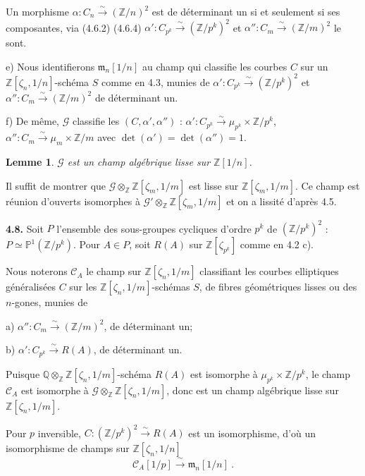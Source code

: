 \documentclass[10pt,a4paper]{amsart}
\theoremstyle{plain}
\newtheorem{lemma}[theorem]{Lemme}
\theoremstyle{definition}
\newcommand{\m}{\mathfrak{m}}
\newcommand{\cC}{\mathcal{C}}
\newcommand{\cG}{\mathcal{G}}
\newcommand{\ZZ}{\mathbb{Z}}
\newcommand{\QQ}{\mathbb{Q}}
\begin{document}
Un morphisme $\alpha : C_n \xrightarrow{\sim} (\ZZ/n)^2$ est de d\'eterminant un si et seulement si ses composantes, via (4.6.2) (4.6.4) $\alpha' : C_{p^k} \xrightarrow{\sim} (\ZZ/p^k)^2$ et $\alpha'' : C_m \xrightarrow{\sim} (\ZZ/m)^2$ le sont.

e) Nous identifierons $\m_n[1/n]$ au champ qui classifie les courbes $C$ sur un $\ZZ[\zeta_n, 1/n]$-sch\'ema $S$ comme en 4.3, munies de $\alpha' : C_{p^k} \xrightarrow{\sim} (\ZZ/p^k)^2$ et $\alpha'' : C_m \xrightarrow{\sim} (\ZZ/m)^2$ de d\'eterminant un.

f) De m\^eme, $\cG$ classifie les $(C, \alpha', \alpha'')$ : $\alpha' : C_{p^k} \xrightarrow{\sim} \mu_{p^k} \times \ZZ/p^k$, $\alpha'' : C_m \xrightarrow{\sim} \mu_m \times \ZZ/m$ avec $\det(\alpha') = \det(\alpha'') = 1$.

\setcounter{theorem}{6}
\begin{lemma}
$\cG$ est un champ alg\'ebrique lisse sur $\ZZ[1/n]$.
\end{lemma}

Il suffit de montrer que $\cG \otimes_\ZZ \ZZ[\zeta_m, 1/m]$ est lisse sur $\ZZ[\zeta_m, 1/m]$. Ce champ est r\'eunion d'ouverts isomorphes \`a $\cG' \otimes_\ZZ \ZZ[\zeta_m, 1/m]$ et on a lissit\'e d'apr\`es 4.5.

\medskip\noindent\textbf{4.8.} Soit $P$ l'ensemble des sous-groupes cycliques d'ordre $p^k$ de $(\ZZ/p^k)^2$ : $P \simeq \mathbb{P}^1(\ZZ/p^k)$. Pour $A \in P$, soit $R(A)$ sur $\ZZ[\zeta_{p^k}]$ comme en 4.2 c).

Nous noterons $\cC_A$ le champ sur $\ZZ[\zeta_n, 1/m]$ classifiant les courbes elliptiques g\'en\'eralis\'ees $C$ sur les $\ZZ[\zeta_n, 1/m]$-sch\'emas $S$, de fibres g\'eom\'etriques lisses ou des $n$-gones, munies de

a) $\alpha'' : C_m \xrightarrow{\sim} (\ZZ/m)^2$, de d\'eterminant un;

b) $\alpha' : C_{p^k} \xrightarrow{\sim} R(A)$, de d\'eterminant un.

Puisque $\QQ \otimes_\ZZ \ZZ[\zeta_n, 1/m]$-sch\'ema $R(A)$ est isomorphe \`a $\mu_{p^k} \times \ZZ/p^k$, le champ $\cC_A$ est isomorphe \`a $\cG \otimes_\ZZ \ZZ[\zeta_n, 1/m]$, donc est un champ alg\'ebrique lisse sur $\ZZ[\zeta_n, 1/m]$.

Pour $p$ inversible, $C : (\ZZ/p^k)^2 \xrightarrow{\sim} R(A)$ est un isomorphisme, d'o\`u un isomorphisme de champs sur $\ZZ[\zeta_n, 1/n]$
\begin{equation}
\cC_A[1/p] \xrightarrow{\;\sim\;} \m_n[1/n]\ .
\end{equation}
\end{document}
